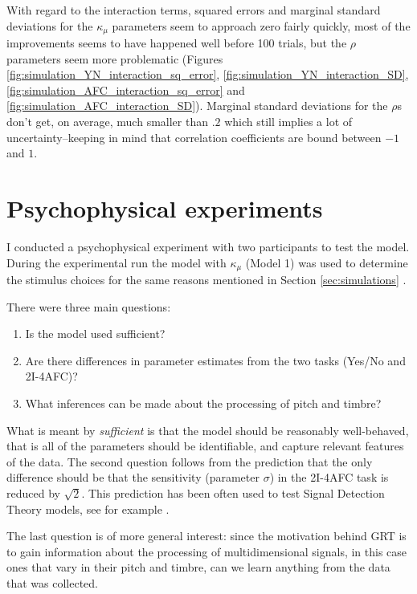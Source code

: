 \documentclass{article}\usepackage{knitr}
\begin{document}
With regard to the interaction terms, squared errors and marginal standard deviations for the $\kappa_{\mu}$ parameters seem to approach zero fairly quickly, most of the improvements seems to have happened well before 100 trials, but the $\rho$ parameters seem more problematic (Figures \ref{fig:simulation_YN_interaction_sq_error}, \ref{fig:simulation_YN_interaction_SD}, \ref{fig:simulation_AFC_interaction_sq_error} and \ref{fig:simulation_AFC_interaction_SD}). Marginal standard deviations for the $\rho$s don't get, on average, much smaller than $.2$ which still implies a lot of uncertainty--keeping in mind that correlation coefficients are bound between $-1$ and $1$.

\newpage


\section{Psychophysical experiments}
\label{sec:pp_exp}

I conducted a psychophysical experiment with two participants to test the model. During the experimental run the model with $\kappa_{\mu}$ (Model 1) was used to determine the stimulus choices for the same reasons mentioned in Section \ref{sec:simulations} \textit{}.

There were three main questions: 

\begin{enumerate}
  \item Is the model used sufficient? 
  \item Are there differences in parameter estimates from the two tasks (Yes/No and 2I-4AFC)?
  \item What inferences can be made about the processing of pitch and timbre?
\end{enumerate}

What is meant by \textit{sufficient} is that the model should be reasonably well-behaved, that is all of the parameters should be identifiable, and capture relevant features of the data. The second question follows from the prediction that the only difference should be that the sensitivity (parameter $\sigma$) in the 2I-4AFC task is reduced by $\sqrt{2}$. This prediction has been often used to test Signal Detection Theory models, see for example \citet{wickens2002}.

The last question is of more general interest: since the motivation behind GRT is to gain information about the processing of multidimensional signals, in this case ones that vary in their pitch and timbre, can we learn anything from the data that was collected. 
 
\end{document}
